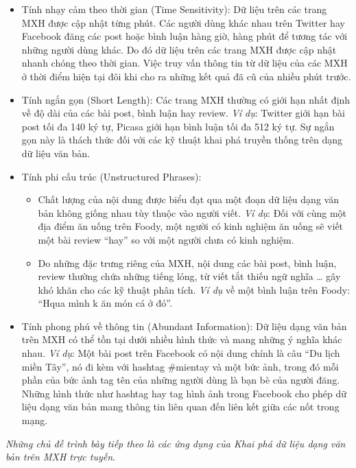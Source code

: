 \documentclass[12pt]{extarticle}
\begin{document}
			\begin{itemize}
				\item Tính nhạy cảm theo thời gian (Time Sensitivity): Dữ liệu trên các trang MXH được cập nhật từng phút. Các người dùng khác nhau trên Twitter hay Facebook đăng các post hoặc bình luận hàng giờ, hàng phút để tương tác với những người dùng khác. Do đó dữ liệu trên các trang MXH được cập nhật nhanh chóng theo thời gian. Việc truy vấn thông tin từ dữ liệu của các MXH ở thời điểm hiện tại đôi khi cho ra những kết quả đã cũ của nhiều phút trước.  
				\item Tính ngắn gọn (Short Length): Các trang MXH thường có giới hạn nhất định về độ dài của các bài post, bình luận hay review. \textit{Ví dụ}: Twitter giới hạn bài post tối đa 140 ký tự, Picasa giới hạn bình luận tối đa 512 ký tự. Sự ngắn gọn này là thách thức đối với các kỹ thuật khai phá truyền thống trên dạng dữ liệu văn bản.
				\item Tính phi cấu trúc (Unstructured Phrases):
					\begin{itemize}
						\item Chất lượng của nội dung được biểu đạt qua một đoạn dữ liệu dạng văn bản không giống nhau tùy thuộc vào người viết. \textit{Ví dụ}: Đối với cùng một địa điểm ăn uống trên Foody, một người có kinh nghiệm ăn uống sẽ viết một bài review “hay” so với một người chưa có kinh nghiệm.
						\item Do những đặc trưng riêng của MXH, nội dung các bài post, bình luận, review thường chứa những tiếng lóng, từ viết tắt thiếu ngữ nghĩa … gây khó khăn cho các kỹ thuật phân tích. \textit{Ví dụ} về một bình luận trên Foody: “Hqua mình k ăn món cá ở đó”.
					\end{itemize}
				\item Tính phong phú về thông tin (Abundant Information): Dữ liệu dạng văn bản trên MXH có thể tồn tại dưới nhiều hình thức và mang những ý nghĩa khác nhau. \textit{Ví dụ}: Một bài post trên Facebook có nội dung chính là câu “Du lịch miền Tây”, nó đi kèm với hashtag \#mientay và một bức ảnh, trong đó mỗi phần của bức ảnh tag tên của những người dùng là bạn bè của người đăng. Những hình thức như hashtag hay tag hình ảnh trong Facebook cho phép dữ liệu dạng văn bản mang thông tin liên quan đến liên kết giữa các nốt trong mạng.
			\end{itemize}
			\par \textit{Những chủ đề trình bày tiếp theo là các ứng dụng của Khai phá dữ liệu dạng văn bản trên MXH trực tuyến}.
					
\end{document}
